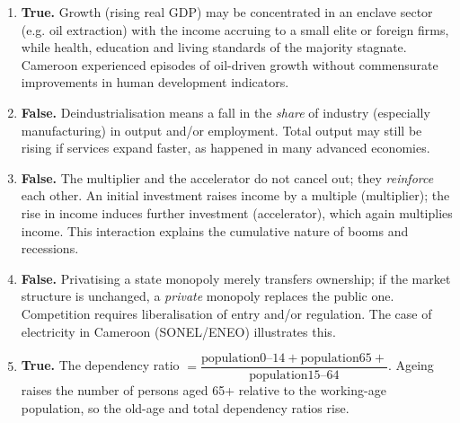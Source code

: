 \documentclass[11pt]{article}
\begin{document}
\begin{corrige}
\begin{enumerate}
\item \textbf{True.} Growth (rising real GDP) may be concentrated in an enclave sector (e.g. oil extraction) with the income accruing to a small elite or foreign firms, while health, education and living standards of the majority stagnate. Cameroon experienced episodes of oil-driven growth without commensurate improvements in human development indicators.
\item \textbf{False.} Deindustrialisation means a fall in the \emph{share} of industry (especially manufacturing) in output and/or employment. Total output may still be rising if services expand faster, as happened in many advanced economies.
\item \textbf{False.} The multiplier and the accelerator do not cancel out; they \emph{reinforce} each other. An initial investment raises income by a multiple (multiplier); the rise in income induces further investment (accelerator), which again multiplies income. This interaction explains the cumulative nature of booms and recessions.
\item \textbf{False.} Privatising a state monopoly merely transfers ownership; if the market structure is unchanged, a \emph{private} monopoly replaces the public one. Competition requires liberalisation of entry and/or regulation. The case of electricity in Cameroon (SONEL/ENEO) illustrates this.
\item \textbf{True.} The dependency ratio $= \dfrac{\text{population} 0\text{--}14 + \text{population} 65+}{\text{population} 15\text{--}64}$. Ageing raises the number of persons aged 65+ relative to the working-age population, so the old-age and total dependency ratios rise.
\end{enumerate}
\end{corrige}
\end{document}

